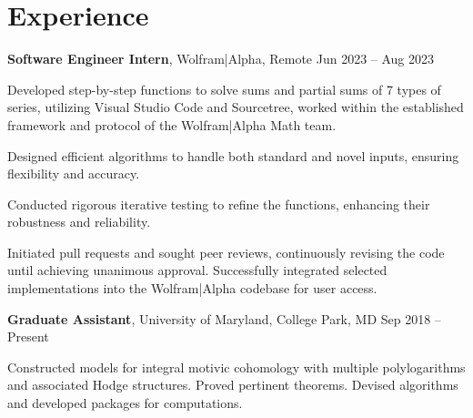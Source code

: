 \section{Experience}


\textbf{Software Engineer Intern}, Wolfram|Alpha, Remote \hfill Jun 2023 – Aug 2023
\begin{customItem}
\item Developed step-by-step functions to solve sums and partial sums of 7 types of series, utilizing Visual Studio Code and Sourcetree, worked within the established framework and protocol of the Wolfram|Alpha Math team.
\item Designed efficient algorithms to handle both standard and novel inputs, ensuring flexibility and accuracy.
\item Conducted rigorous iterative testing to refine the functions, enhancing their robustness and reliability.
\item Initiated pull requests and sought peer reviews, continuously revising the code until achieving unanimous approval. Successfully integrated selected implementations into the Wolfram|Alpha codebase for user access.
\end{customItem}

\vspace{0.1 cm}

\textbf{Graduate Assistant}, University of Maryland, College Park, MD \hfill Sep 2018 – Present
\begin{customItem}
\item Constructed models for integral motivic cohomology with multiple polylogarithms and associated Hodge structures. Proved pertinent theorems. Devised algorithms and developed packages for computations.
\end{customItem}

